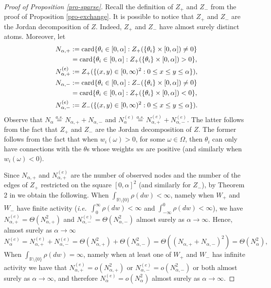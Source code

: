 \documentclass{article}
\theoremstyle{plain}
\theoremstyle{remark}
\begin{document}
\begin{proof}[Proof of Proposition \ref{pro-sparse}]
	Recall the definition of $Z_+$ and $Z_-$ from the proof of Proposition \ref{pro-exchange}. It is possible to notice that $Z_+$ and $Z_-$ are the Jordan decomposition of $Z$. Indeed, $Z_+$ and $Z_-$ have almost surely distinct atoms. Moreover, let 
	\begin{align*}
		N_{\alpha,+}&:=\textnormal{card}\{\theta_i\in[0,\alpha]:Z_+(\{\theta_i\}\times[0,\alpha])\neq 0\}\\&=\textnormal{card}\{\theta_i\in[0,\alpha]:Z_+(\{\theta_i\}\times[0,\alpha])> 0\},\\
		N_{\alpha,+}^{(e)}&:=Z_+(\{(x,y)\in[0,\infty)^2: 0\leq x\leq y\leq\alpha\}),\\
		N_{\alpha,-}&:=\textnormal{card}\{\theta_i\in[0,\alpha]:Z_-(\{\theta_i\}\times[0,\alpha])\neq 0\}\\&=\textnormal{card}\{\theta_i\in[0,\alpha]:Z_+(\{\theta_i\}\times[0,\alpha])< 0\},\\
		N_{\alpha,-}^{(e)}&:=Z_-(\{(x,y)\in[0,\infty)^2: 0\leq x\leq y\leq\alpha\}).
	\end{align*}
	Observe that $N_\alpha\stackrel{a.s.}{=}N_{\alpha,+}+N_{\alpha,-}$ and $N_\alpha^{(e)}\stackrel{a.s.}{=}N_{\alpha,+}^{(e)}+N_{\alpha,-}^{(e)}$. The latter follows from the fact that $Z_+$ and $Z_-$ are the Jordan decomposition of $Z$. The former follows from the fact that when $w_i(\omega)> 0$, for some $\omega\in\Omega$, then $\theta_i$ can only have connections with the $\theta$s whose weights $w$s are positive (and similarly when $w_i(\omega)< 0$). 
	
	Since $N_{\alpha,+}$ and $N_{\alpha,+}^{(e)}$ are the number of observed nodes and the number of the edges of $Z_+$ restricted on the square $[0,\alpha]^2$ (and similarly for $Z_-$), by Theorem 2 in \cite{Caron-and-Fox} we obtain the following. When $\int_{\mathbb{R}\setminus\{0\}}\rho(dw)<\infty$, namely when $W_+$ and $W_-$ have finite activity (\textit{i.e.}~$\int_{0}^{\infty}\rho(dw)<\infty$ and $\int_{-\infty}^{0}\rho(dw)<\infty$), we have $N_{\alpha,+}^{(e)}=\Theta(N_{\alpha,+}^2)$ and $N_{\alpha,-}^{(e)}=\Theta(N_{\alpha,-}^2)$ almost surely as $\alpha\to\infty$. Hence, almost surely as $\alpha\to\infty$
	\begin{equation*}
		N_{\alpha}^{(e)}=N_{\alpha,+}^{(e)}+N_{\alpha,-}^{(e)}=\Theta(N_{\alpha,+}^2)+\Theta(N_{\alpha,-}^2)=\Theta((N_{\alpha,+}+N_{\alpha,-})^2)=\Theta(N_{\alpha}^2),
	\end{equation*}
	When $\int_{\mathbb{R}\setminus\{0\}}\rho(dw)=\infty$, namely when at least one of $W_+$ and $W_-$ has infinite activity we have that $N_{\alpha,+}^{(e)}=o(N_{\alpha,+}^2)$ or $N_{\alpha,-}^{(e)}=o(N_{\alpha,-}^2)$ or both almost surely as $\alpha\to\infty$, and therefore $N_{\alpha}^{(e)}=o(N_{\alpha}^2)$ almost surely as $\alpha\to\infty$.
\end{proof}
	
	
	
	
	
\end{document}
